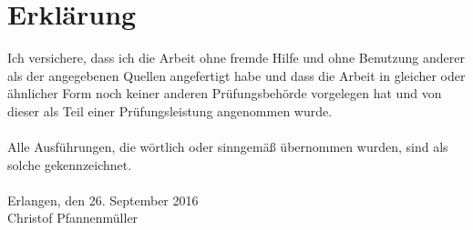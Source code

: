 
\chapter*{Erklärung}
\label{sec:Erklärung}
Ich versichere, dass ich die Arbeit ohne fremde Hilfe und ohne Benutzung anderer als der angegebenen Quellen angefertigt habe und dass die Arbeit in gleicher oder ähnlicher Form noch keiner anderen Prüfungsbehörde vorgelegen hat und von dieser als Teil einer Prüfungsleistung angenommen wurde. \\
\\
Alle Ausführungen, die wörtlich oder sinngemäß übernommen wurden, sind als solche gekennzeichnet. \\
\vspace{1.0cm}
\\
Erlangen, den 26. September 2016
\vspace{2.5cm}
\\
Christof Pfannenmüller

